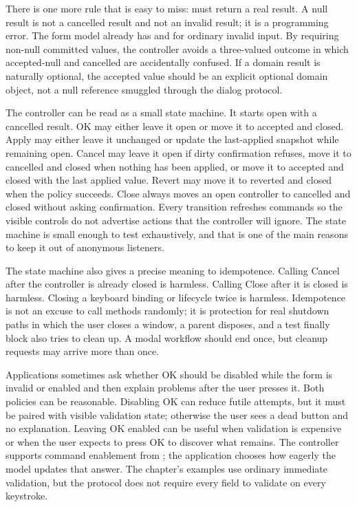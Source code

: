 There is one more rule that is easy to miss:  must return a real
result. A null result is not a cancelled result and not an invalid result; it is
a programming error. The form model already has  and
 for ordinary invalid input. By requiring non-null committed
values, the controller avoids a three-valued outcome in which accepted-null and
cancelled are accidentally confused. If a domain result is naturally optional,
the accepted value should be an explicit optional domain object, not a null
reference smuggled through the dialog protocol.

The controller can be read as a small state machine. It starts open with a
cancelled result. OK may either leave it open or move it to accepted and closed.
Apply may either leave it unchanged or update the last-applied snapshot while
remaining open. Cancel may leave it open if dirty confirmation refuses, move it
to cancelled and closed when nothing has been applied, or move it to accepted
and closed with the last applied value. Revert may move it to reverted and
closed when the policy succeeds. Close always moves an open controller to
cancelled and closed without asking confirmation. Every transition refreshes
commands so the visible controls do not advertise actions that the controller
will ignore. The state machine is small enough to test exhaustively, and that
is one of the main reasons to keep it out of anonymous listeners.

The state machine also gives a precise meaning to idempotence. Calling Cancel
after the controller is already closed is harmless. Calling Close after it is
closed is harmless. Closing a keyboard binding or lifecycle twice is harmless.
Idempotence is not an excuse to call methods randomly; it is protection for
real shutdown paths in which the user closes a window, a parent disposes, and a
test finally block also tries to clean up. A modal workflow should end once,
but cleanup requests may arrive more than once.

Applications sometimes ask whether OK should be disabled while the form is
invalid or enabled and then explain problems after the user presses it. Both
policies can be reasonable. Disabling OK can reduce futile attempts, but it
must be paired with visible validation state; otherwise the user sees a dead
button and no explanation. Leaving OK enabled can be useful when validation is
expensive or when the user expects to press OK to discover what remains. The
controller supports command enablement from ; the
application chooses how eagerly the model updates that answer. The chapter's
examples use ordinary immediate validation, but the protocol does not require
every field to validate on every keystroke.

